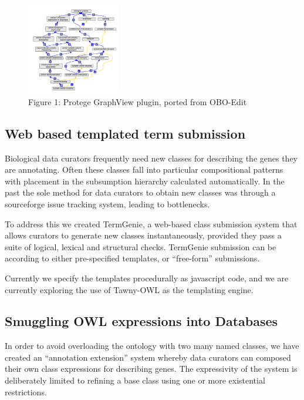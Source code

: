 \documentclass{llncs}
\begin{document}
\begin{figure}
\label{gv}
\center
\includegraphics[height=4cm]{gv-plugin}
\caption{Figure 1: Protege GraphView plugin, ported from OBO-Edit}
\end{figure}

\subsection{Web based templated term submission}

Biological data curators frequently need new classes for describing
the genes they are annotating. Often these classes fall into
particular compositional patterns with placement in the subsumption
hierarchy calculated automatically. In the past the sole method for
data curators to obtain new classes was through a sourceforge issue
tracking system, leading to bottlenecks.

To address this we created TermGenie\cite{Dietze2014}, a web-based
class submission system that allows curators to generate new classes
instantaneously, provided they pass a suite of logical, lexical and
structural checks. TermGenie submission can be according to either
pre-specified templates, or ``free-form'' submissions.

Currently we specify the templates procedurally as javascript code,
and we are currently exploring the use of Tawny-OWL\cite{lord2013semantic} as the
templating engine.


\subsection{Smuggling OWL expressions into Databases}

In order to avoid overloading the ontology with two many named
classes, we have created an ``annotation extension'' system whereby
data curators can composed their own class expressions for describing
genes\cite{Huntley2014}. The expressivity of the system is
deliberately limited to refining a base class using one or more
existential restrictions.
\end{document}
